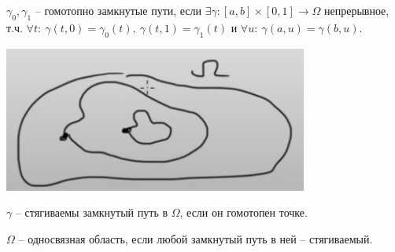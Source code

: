\begin{definition}
\begin{enumerate}
{            $\gamma_0, \gamma_1$ -- гомотопно замкнутые пути, если $\exists \gamma: [a, b] \times [0, 1] \rightarrow \Omega$ непрерывное, т.ч. $\forall t : \ \gamma(t, 0) = \gamma_0(t), \ \gamma(t, 1) = \gamma_1(t)$ и $\forall u: \ \gamma(a, u) = \gamma(b, u)$.

            \begin{center}
                \includegraphics[width=10cm]{assets/03-intergrals-with-params/difinition-picture-3.png}
            \end{center}
        }
    \end{enumerate}
\end{definition}
\begin{definition}
    $\gamma$ -- стягиваемы замкнутый путь в $\Omega$, если он гомотопен точке.
\end{definition}
\begin{definition}
    $\Omega$ -- односвязная область, если любой замкнутый путь в ней -- стягиваемый. 
\end{definition}
